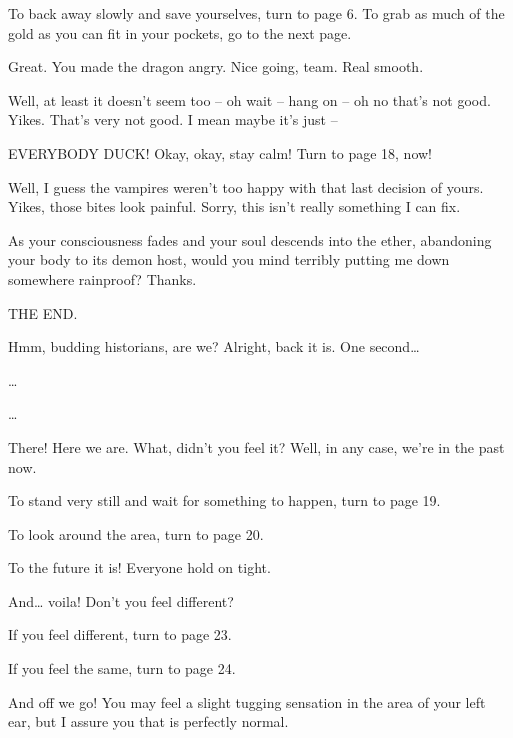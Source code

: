 \documentclass[14pt]{extbook}
\begin{document}
To back away slowly and save yourselves, turn to page 6.
To grab as much of the gold as you can fit in your pockets, go to the next page.
\vspace*{\fill}
\newpage

\vspace*{\fill}
Great. You made the dragon angry. Nice going, team. Real smooth.

Well, at least it doesn’t seem too -- oh wait -- hang on -- oh no that’s not good. Yikes. That’s very not good. I mean maybe it’s just --

EVERYBODY DUCK! Okay, okay, stay calm! Turn to page 18, now!
\vspace*{\fill}
\newpage

\vspace*{\fill}
Well, I guess the vampires weren’t too happy with that last decision of yours. Yikes, those bites look painful. Sorry, this isn’t really something I can fix.

As your consciousness fades and your soul descends into the ether, abandoning your body to its demon host, would you mind terribly putting me down somewhere rainproof? Thanks.

\begin{center}
  THE END.
\end{center}
\vspace*{\fill}
\newpage

\vspace*{\fill}
Hmm, budding historians, are we? Alright, back it is. One second…

…

…

There! Here we are. What, didn’t you feel it? Well, in any case, we’re in the past now.

To stand very still and wait for something to happen, turn to page 19.

To look around the area, turn to page 20.
\vspace*{\fill}
\newpage

\vspace*{\fill}
To the future it is! Everyone hold on tight.

And… voila! Don’t you feel different?

If you feel different, turn to page 23.

If you feel the same, turn to page 24.
\vspace*{\fill}
\newpage

\vspace*{\fill}
And off we go! You may feel a slight tugging sensation in the area of your left ear, but I assure you that is perfectly normal.
\end{document}
